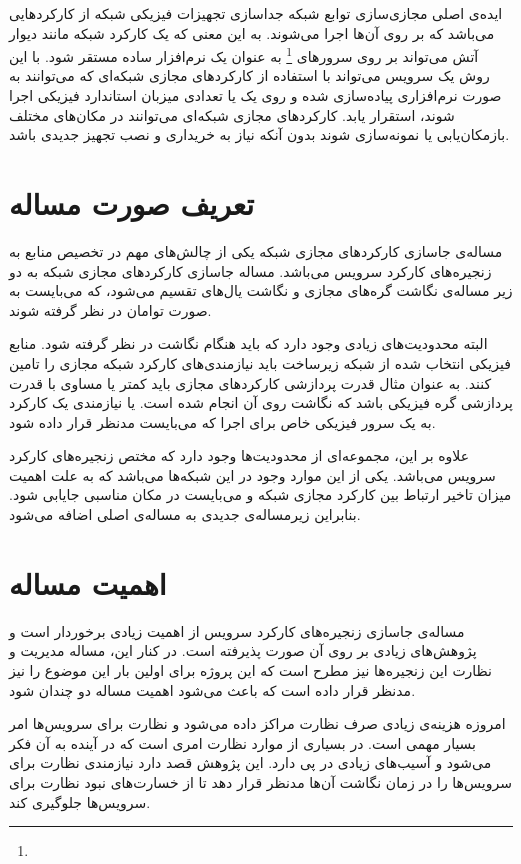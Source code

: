 ایده‌ی اصلی مجازی‌سازی توابع شبکه جداسازی تجهیزات فیزیکی شبکه از کارکردهایی می‌باشد که
بر روی آن‌ها اجرا می‌شوند.
به این معنی که یک کارکرد شبکه مانند دیوار آتش می‌تواند بر روی سرورهای
\footnote{}
به عنوان یک نرم‌افزار ساده مستقر شود.
با این روش یک سرویس می‌تواند با استفاده از کارکردهای مجازی شبکه‌ای که می‌توانند به صورت نرم‌افزاری پیاده‌سازی شده
و روی یک یا تعدادی میزبان استاندارد فیزیکی اجرا شوند، استقرار یابد.
کارکردهای مجازی شبکه‌ای می‌توانند در مکان‌های مختلف بازمکان‌یابی یا نمونه‌سازی شوند بدون آنکه
نیاز به خریداری و نصب تجهیز جدیدی باشد.
\cite{Mijumbi2016}

\section{تعریف صورت مساله}
مساله‌ی جاسازی کارکردهای مجازی شبکه یکی از چالش‌های مهم در تخصیص منابع به زنجیره‌های کارکرد سرویس می‌باشد.
مساله جاسازی کارکردهای مجازی شبکه به دو زیر مساله‌ی نگاشت گره‌های مجازی و نگاشت یال‌های تقسیم می‌شود، که می‌بایست
به صورت توامان در نظر گرفته شوند.

البته محدودیت‌های زیادی وجود دارد که باید هنگام نگاشت در نظر گرفته شود. منابع فیزیکی انتخاب شده
از شبکه زیرساخت باید نیازمندی‌های کارکرد شبکه مجازی را تامین کنند. به عنوان مثال
قدرت پردازشی کارکرد‌های مجازی باید کمتر یا مساوی با قدرت پردازشی گره فیزیکی باشد که نگاشت
روی آن انجام شده است.
یا نیازمندی یک کارکرد به یک سرور فیزیکی خاص
برای اجرا که می‌بایست مدنظر قرار داده شود.

علاوه بر این، مجموعه‌ای از محدودیت‌ها وجود دارد که مختص زنجیره‌های کارکرد سرویس می‌باشد.
یکی از این موارد وجود
در این شبکه‌ها می‌باشد که به علت اهمیت میزان تاخیر ارتباط بین کارکرد مجازی شبکه و
می‌بایست در مکان مناسبی جایابی شود. بنابراین زیرمساله‌ی جدیدی به مساله‌ی اصلی اضافه می‌شود.

\section{اهمیت مساله}
مساله‌ی جاسازی زنجیره‌های کارکرد سرویس از اهمیت زیادی برخوردار است و پژوهش‌های زیادی
بر روی آن صورت پذیرفته است.
در کنار این، مساله مدیریت و نظارت این زنجیره‌ها نیز مطرح است
که این پروژه برای اولین بار این موضوع را نیز مدنظر قرار داده است که باعث می‌شود اهمیت
مساله دو چندان شود.

امروزه هزینه‌ی زیادی صرف نظارت مراکز داده می‌شود و نظارت برای سرویس‌ها امر بسیار مهمی است.
در بسیاری از موارد نظارت امری است که در آینده به آن فکر می‌شود و
آسیب‌های زیادی در پی دارد.
این پژوهش قصد دارد نیازمندی نظارت برای سرویس‌ها را در زمان نگاشت آن‌ها مدنظر قرار دهد تا
از خسارت‌های نبود نظارت برای سرویس‌ها جلوگیری کند.

